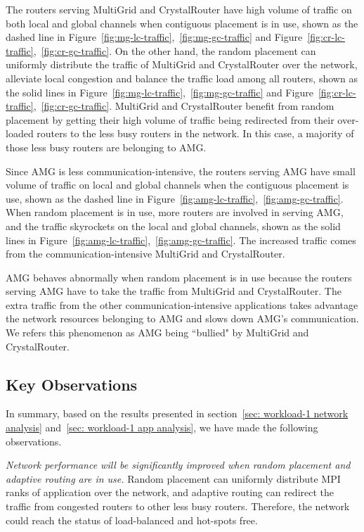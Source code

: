 The routers serving MultiGrid and CrystalRouter have high volume of traffic on both local and global channels when contiguous placement is in use, 
shown as the dashed line in Figure~\ref{fig:mg-lc-traffic},~\ref{fig:mg-gc-traffic} and Figure~\ref{fig:cr-lc-traffic},~\ref{fig:cr-gc-traffic}. 
On the other hand, the random placement can uniformly distribute the traffic of MultiGrid and CrystalRouter over the network, 
alleviate local congestion and balance the traffic load among all routers, 
shown as the solid lines in Figure~\ref{fig:mg-lc-traffic},~\ref{fig:mg-gc-traffic} and Figure~\ref{fig:cr-lc-traffic},~\ref{fig:cr-gc-traffic}. 
MultiGrid and CrystalRouter benefit from random placement by getting their high volume of traffic being redirected 
from their over-loaded routers to the less busy routers in the network. 
In this case, a majority of those less busy routers are belonging to AMG.



Since AMG is less communication-intensive, 
the routers serving AMG have small volume of traffic on local and global channels when the contiguous placement is use, 
shown as the dashed line in Figure~\ref{fig:amg-lc-traffic},~\ref{fig:amg-gc-traffic}. 
When random placement is in use, 
more routers are involved in serving AMG, 
and the traffic skyrockets on the local and global channels, 
shown as the solid lines in Figure~\ref{fig:amg-lc-traffic},~\ref{fig:amg-gc-traffic}. 
The increased traffic comes from the communication-intensive MultiGrid and CrystalRouter. 



AMG behaves abnormally when random placement is in use 
because the routers serving AMG have to take the traffic from MultiGrid and CrystalRouter. 
The extra traffic from the other communication-intensive applications 
takes advantage the network resources belonging to AMG and slows down AMG's communication. 
We refers this phenomenon as AMG being ``bullied" by MultiGrid and CrystalRouter.



\subsection{Key Observations}
In summary, based on the results presented in section~\ref{sec: workload-1 network analysis} and~\ref{sec: workload-1 app analysis}, we have made the following observations.


\emph{Network performance will be significantly improved when random placement and adaptive routing are in use.} 
Random placement can uniformly distribute MPI ranks of application over the network, 
and adaptive routing can redirect the traffic from congested routers to other less busy routers. 
Therefore, the network could reach the status of load-balanced and hot-spots free. 


